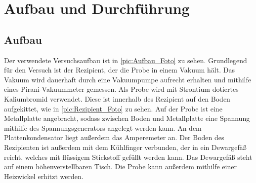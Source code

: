 \section{Aufbau und Durchführung}

\subsection{Aufbau}
\label{subsec:Aufbau}
Der verwendete Versuchsaufbau ist in \autoref{pic:Aufbau_Foto} zu sehen. Grundlegend für den Versuch ist der Rezipient, der die Probe in einem Vakuum hält. Das Vakuum wird dauerhaft durch eine Vakuumpumpe aufrecht erhalten und mithilfe eines Pirani-Vakuummeter gemessen. Als Probe wird mit Strontium dotiertes Kaliumbromid verwendet. Diese ist innerhalb des Rezipient auf den Boden aufgekittet, wie in \autoref{pic:Rezipient_Foto} zu sehen. Auf der Probe ist eine Metallplatte angebracht, sodass zwischen Boden und Metallplatte eine Spannung mithilfe des Spannungsgenerators angelegt werden kann. An dem Plattenkondensator liegt außerdem das Amperemeter an. Der Boden des Rezipienten ist außerdem mit dem Kühlfinger verbunden, der in ein Dewargefäß reicht, welches mit flüssigem Stickstoff gefüllt werden kann. Das Dewargefäß steht auf einem höhenverstellbaren Tisch. Die Probe kann außerdem mithilfe einer Heizwickel erhitzt werden.

